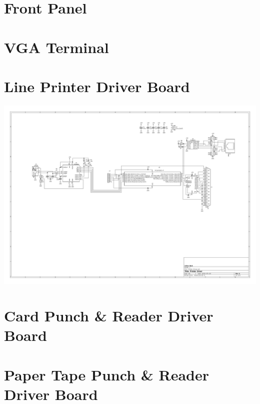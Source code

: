 \documentclass{book}
\begin{document}
\section{Front Panel}
\clearpage
\section{VGA Terminal}
\clearpage
\section{Line Printer Driver Board}
\begin{sideways}
\centering
\includegraphics[height=1.1\textwidth]{../Board_Layouts/Printer_Driver/Printer_Driver.pdf}
\end{sideways}
\clearpage
\section{Card Punch \& Reader Driver Board}
\clearpage
\section{Paper Tape Punch \& Reader Driver Board}
\end{document}
